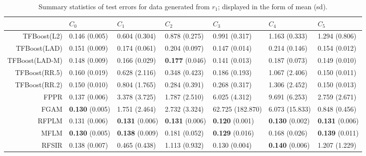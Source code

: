 \begin{table}[H]
\footnotesize
\centering
\begin{tabular}{rllllll}
  \hline
 & $C_0$ & $C_1$ & $C_2$ & $C_3$ & $C_4$ & $C_5$ \\ 
  \hline
TFBoost(L2) & 0.146 (0.005) & 0.604 (0.304) & 0.878 (0.275) & 0.991 (0.317) & 1.163 (0.333) & 1.294 (0.806) \\ 
  TFBoost(LAD) & 0.151 (0.009) & 0.174 (0.061) & 0.204 (0.097) & 0.147 (0.014) & 0.214 (0.146) & 0.154 (0.012) \\ 
  TFBoost(LAD-M) & 0.148 (0.009) & 0.166 (0.029) & \textbf{0.177} (0.046) & 0.141 (0.013) & 0.187 (0.073) & 0.149 (0.010) \\ 
  TFBoost(RR.5) & 0.160 (0.019) & 0.628 (2.116) & 0.348 (0.423) & 0.186 (0.193) & 1.067 (2.406) & 0.150 (0.011) \\ 
  TFBoost(RR.2) & 0.150 (0.010) & 0.804 (1.765) & 0.284 (0.391) & 0.268 (0.317) & 1.306 (2.452) & 0.150 (0.013) \\ 
  FPPR & 0.137 (0.006) & 3.378 (3.725) & 1.787 (2.510) & 6.025 (4.312) & 9.691 (6.253) & 2.759 (2.671) \\ 
  FGAM & \textbf{0.130} (0.005) & 1.751 (2.464) & 2.732 (3.324) & 62.725 (182.870) & 6.073 (15.833) & 0.848 (0.456) \\ 
  RFPLM & 0.131 (0.006) & \textbf{0.131} (0.006) & \textbf{0.131} (0.006) & \textbf{0.120} (0.001) & \textbf{0.130} (0.002) & \textbf{0.131} (0.006) \\ 
  MFLM & \textbf{0.130} (0.005) & \textbf{0.138} (0.009) & 0.181 (0.052) & \textbf{0.129} (0.016) & 0.168 (0.026) & \textbf{0.139} (0.011) \\ 
  RFSIR & 0.138 (0.007) & 0.465 (0.438) & 1.113 (0.932) & 0.130 (0.004) & \textbf{0.140} (0.006) & 1.207 (1.229) \\ 
   \hline
\end{tabular}
\caption{Summary statistics of test errors for data generated from $r_1$; displayed in the form of mean (sd).} 
\end{table}
